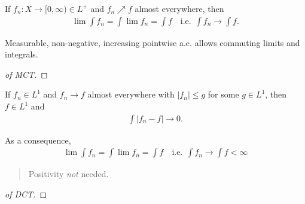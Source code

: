 \begin{theorem}

If \(f_n: X\to [0, \infty) \in L^+\) and \(f_n \nearrow f\) almost
everywhere, then
\begin{align*}
\lim \int f_n
= \int \lim f_n = \int f
\quad \text{i.e.}~~ \int f_n \to \int f
.\end{align*}

\end{theorem}

\begin{slogan}

Measurable, non-negative, increasing pointwise a.e. allows commuting
limits and integrals.

\end{slogan}

\begin{proof}[of MCT]


\end{proof}

\begin{theorem}

If \(f_n \in L^1\) and \(f_n \to f\) almost everywhere with
\({\left\lvert {f_n} \right\rvert} \leq g\) for some \(g\in L^1\), then
\(f\in L^1\) and
\begin{align*}
\int {\left\lvert {f_n - f} \right\rvert} \to 0
.\end{align*}

As a consequence,
\begin{align*}
\lim \int f_n = \int \lim f_n = \int f \quad \text{i.e.}~~ \int f_n \to \int f < \infty
\end{align*}

\begin{quote}
Positivity \emph{not} needed.
\end{quote}

\end{theorem}

\begin{proof}[of DCT]


\end{proof}

